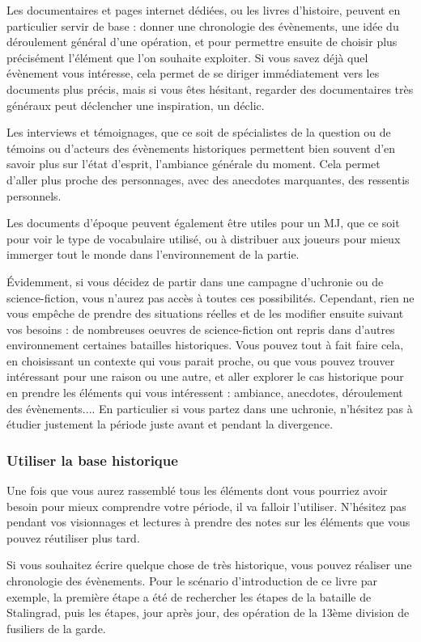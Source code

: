 \documentclass{report}
\begin{document}
\begin{multicols}{2}
Les documentaires et pages internet dédiées, ou les livres d'histoire, peuvent en particulier servir de base : donner une chronologie des évènements, une idée du déroulement général d'une opération, et pour permettre ensuite de choisir plus précisément l'élément que l'on souhaite exploiter. Si vous savez déjà quel évènement vous intéresse, cela permet de se diriger immédiatement vers les documents plus précis, mais si vous êtes hésitant, regarder des documentaires très généraux peut déclencher une inspiration, un déclic.

Les interviews et témoignages, que ce soit de spécialistes de la question ou de témoins ou d'acteurs des évènements historiques permettent bien souvent d'en savoir plus sur l'état d'esprit, l'ambiance générale du moment. Cela permet d'aller plus proche des personnages, avec des anecdotes marquantes, des ressentis personnels.

Les documents d'époque peuvent également être utiles pour un MJ, que ce soit pour voir le type de vocabulaire utilisé, ou à distribuer aux joueurs pour mieux immerger tout le monde dans l'environnement de la partie.

Évidemment, si vous décidez de partir dans une campagne d'uchronie ou de science-fiction, vous n'aurez pas accès à toutes ces possibilités. Cependant, rien ne vous empêche de prendre des situations réelles et de les modifier ensuite suivant vos besoins : de nombreuses oeuvres de science-fiction ont repris dans d'autres environnement certaines batailles historiques. Vous pouvez tout à fait faire cela, en choisissant un contexte qui vous parait proche, ou que vous pouvez trouver intéressant pour une raison ou une autre, et aller explorer le cas historique pour en prendre les éléments qui vous intéressent : ambiance, anecdotes, déroulement des évènements.... En particulier si vous partez dans une uchronie, n'hésitez pas à étudier justement la période juste avant et pendant la divergence.
\subsubsection{Utiliser la base historique}
Une fois que vous aurez rassemblé tous les éléments dont vous pourriez avoir besoin pour mieux comprendre votre période, il va falloir l'utiliser. N'hésitez pas pendant vos visionnages et lectures à prendre des notes sur les éléments que vous pouvez réutiliser plus tard.

Si vous souhaitez écrire quelque chose de très historique, vous pouvez réaliser une chronologie des évènements. Pour le scénario d'introduction de ce livre par exemple, la première étape a été de rechercher les étapes de la bataille de Stalingrad, puis les étapes, jour après jour, des opération de la 13ème division de fusiliers de la garde.


\end{multicols}
\end{document}
